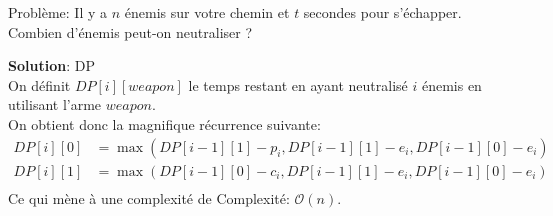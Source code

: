\begin{frame}
    \frametitle{\problemtitle}
        \begin{block}
            {Problème:} Il y a $n$ énemis sur votre chemin et $t$ secondes pour s'échapper. Combien d'énemis peut-on neutraliser ?
        \end{block}
        \pause
        \textbf{Solution}: DP \\
        \pause
        On définit $DP[i][weapon]$ le temps restant en ayant neutralisé $i$ énemis en utilisant l'arme $weapon$.\\
        \pause
        On obtient donc la magnifique récurrence suivante:\\
        \begin{align*}
            DP[i][0] &= \max(DP[i-1][1] - p_i, DP[i-1][1] - e_i, DP[i-1][0] - e_i)\\
            DP[i][1] &= \max(DP[i-1][0] - c_i, DP[i-1][1] - e_i, DP[i-1][0] - e_i)\\
        \end{align*}
        Ce qui mène à une complexité de Complexité: $\mathcal O(n)$.
\end{frame}
